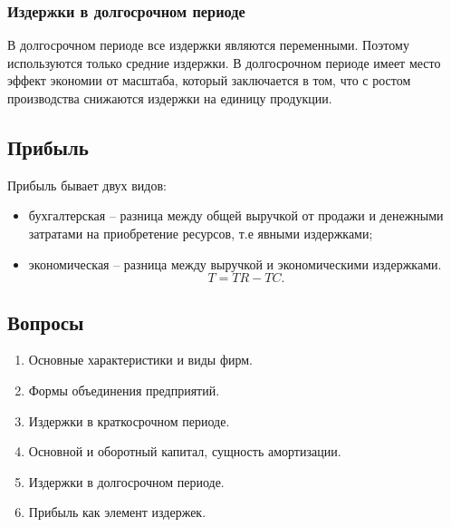 \subsubsection{Издержки в долгосрочном периоде}

В долгосрочном периоде все издержки являются переменными. Поэтому используются
только средние издержки. В долгосрочном периоде имеет место эффект экономии
от масштаба, который заключается в том, что с ростом производства снижаются
издержки на единицу продукции.

\subsection{Прибыль}

Прибыль бывает двух видов:
\begin{itemize}
    \item бухгалтерская -- разница между общей выручкой от продажи и денежными
        затратами на приобретение ресурсов, т.е явными издержками;
    \item экономическая -- разница между выручкой и экономическими издержками.
        \[
            T = TR - TC.
        \]
\end{itemize}

\subsection{Вопросы}
\begin{enumerate}
    \item Основные характеристики и виды фирм.
    \item Формы объединения предприятий.
    \item Издержки в краткосрочном периоде.
    \item Основной и оборотный капитал, сущность амортизации.
    \item Издержки в долгосрочном периоде.
    \item Прибыль как элемент издержек.
\end{enumerate}

